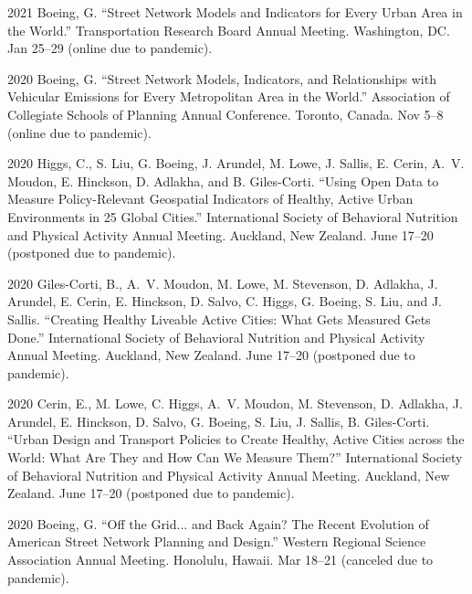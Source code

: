 \documentclass[12pt,letterpaper]{report}
\begin{document}
    \begin{tablist}

        \item[2021] \tab Boeing, G. \enquote{Street Network Models and Indicators for Every Urban Area in the World.} Transportation Research Board Annual Meeting. Washington, DC. Jan 25--29 (online due to pandemic).

        \item[2020] \tab Boeing, G. \enquote{Street Network Models, Indicators, and Relationships with Vehicular Emissions for Every Metropolitan Area in the World.} Association of Collegiate Schools of Planning Annual Conference. Toronto, Canada. Nov 5--8 (online due to pandemic).

        \item[2020] \tab Higgs, C.,  S. Liu, G. Boeing, J. Arundel, M. Lowe, J. Sallis, E. Cerin, A.~V. Moudon, E. Hinckson, D. Adlakha, and B. Giles-Corti. \enquote{Using Open Data to Measure Policy-Relevant Geospatial Indicators of Healthy, Active Urban Environments in 25 Global Cities.} International Society of Behavioral Nutrition and Physical Activity Annual Meeting. Auckland, New Zealand. June 17--20 (postponed due to pandemic).

        \item[2020] \tab Giles-Corti, B.,  A.~V. Moudon, M. Lowe, M. Stevenson, D. Adlakha, J. Arundel, E. Cerin, E. Hinckson, D. Salvo, C. Higgs, G. Boeing, S. Liu, and J. Sallis. \enquote{Creating Healthy Liveable Active Cities: What Gets Measured Gets Done.} International Society of Behavioral Nutrition and Physical Activity Annual Meeting. Auckland, New Zealand. June 17--20 (postponed due to pandemic).

        \item[2020] \tab Cerin, E., M. Lowe, C. Higgs, A.~V. Moudon, M. Stevenson, D. Adlakha, J. Arundel, E. Hinckson, D. Salvo, G. Boeing, S. Liu, J. Sallis, B. Giles-Corti. \enquote{Urban Design and Transport Policies to Create Healthy, Active Cities across the World: What Are They and How Can We Measure Them?} International Society of Behavioral Nutrition and Physical Activity Annual Meeting. Auckland, New Zealand. June 17--20 (postponed due to pandemic).

        \item[2020] \tab Boeing, G. \enquote{Off the Grid... and Back Again? The Recent Evolution of American Street Network Planning and Design.} Western Regional Science Association Annual Meeting. Honolulu, Hawaii. Mar 18--21 (canceled due to pandemic).


\end{tablist}
\end{document}
